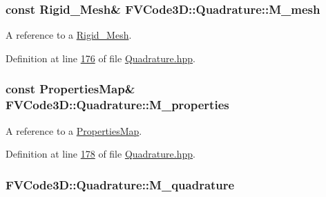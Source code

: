 \subsubsection[{\texorpdfstring{M\+\_\+mesh}{M_mesh}}]{\setlength{\rightskip}{0pt plus 5cm}const {\bf Rigid\+\_\+\+Mesh}\& F\+V\+Code3\+D\+::\+Quadrature\+::\+M\+\_\+mesh\hspace{0.3cm}{\ttfamily [protected]}}\hypertarget{classFVCode3D_1_1Quadrature_abaa2519ea32065df30242bd5f5cb2d01}{}\label{classFVCode3D_1_1Quadrature_abaa2519ea32065df30242bd5f5cb2d01}


A reference to a \hyperlink{classFVCode3D_1_1Rigid__Mesh}{Rigid\+\_\+\+Mesh}. 



Definition at line \hyperlink{Quadrature_8hpp_source_l00176}{176} of file \hyperlink{Quadrature_8hpp_source}{Quadrature.\+hpp}.

\subsubsection[{\texorpdfstring{M\+\_\+properties}{M_properties}}]{\setlength{\rightskip}{0pt plus 5cm}const {\bf Properties\+Map}\& F\+V\+Code3\+D\+::\+Quadrature\+::\+M\+\_\+properties\hspace{0.3cm}{\ttfamily [protected]}}\hypertarget{classFVCode3D_1_1Quadrature_ace6cd23087209d3186ae173c265cde39}{}\label{classFVCode3D_1_1Quadrature_ace6cd23087209d3186ae173c265cde39}


A reference to a \hyperlink{classFVCode3D_1_1PropertiesMap}{Properties\+Map}. 



Definition at line \hyperlink{Quadrature_8hpp_source_l00178}{178} of file \hyperlink{Quadrature_8hpp_source}{Quadrature.\+hpp}.

\subsubsection[{\texorpdfstring{M\+\_\+quadrature}{M_quadrature}}]{ F\+V\+Code3\+D\+::\+Quadrature\+::\+M\+\_\+quadrature\hspace{0.3cm}{\ttfamily [protected]}}\hypertarget{classFVCode3D_1_1Quadrature_a9a128b9525429cca80435552ee3b6e56}{}\label{classFVCode3D_1_1Quadrature_a9a128b9525429cca80435552ee3b6e56}


